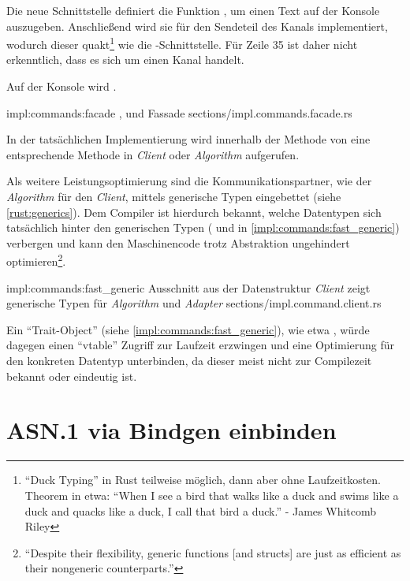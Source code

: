 Die neue Schnittstelle  definiert die Funktion , um einen Text auf der Konsole auszugeben.
Anschließend wird sie für den Sendeteil des Kanals implementiert, wodurch dieser quakt\footnote{\enquote{Duck Typing} \cite[44]{rust:orly_programming} in Rust teilweise möglich, dann aber ohne Laufzeitkosten. Theorem in etwa: \enquote{When I see a bird that walks like a duck and swims like a duck and quacks like a duck, I call that bird a duck.} - James Whitcomb Riley  } wie die -Schnittstelle.
Für Zeile 35 ist daher nicht erkenntlich, dass es sich um einen Kanal handelt.

Auf der Konsole wird  .

\rustcinclude
	{impl:commands:facade}
	{, und Fassade}
	{sections/impl.commands.facade.rs}

In der tatsächlichen Implementierung wird innerhalb der  Methode von  eine entsprechende Methode in \textit{Client} oder \textit{Algorithm} aufgerufen.

Als weitere Leistungsoptimierung sind die Kommunikationspartner, wie der \textit{Algorithm} für den \textit{Client}, mittels generische Typen eingebettet (siehe \autoref{rust:generics}).
Dem Compiler ist hierdurch bekannt, welche Datentypen sich tatsächlich hinter den generischen Typen ( und  in \autoref{impl:commands:fast_generic}) verbergen und kann den Maschinencode trotz Abstraktion ungehindert optimieren\footnote{\enquote{Despite their flexibility, generic functions [and structs] are just as efficient as their nongeneric counterparts.}\cite[45]{rust:orly_programming}}.

\rustcinclude
	{impl:commands:fast_generic}
	{Ausschnitt aus der Datenstruktur \textit{Client} zeigt generische Typen für \textit{Algorithm} und \textit{Adapter}}
	{sections/impl.command.client.rs}
	
Ein \enquote{Trait-Object} (siehe \autoref{impl:commands:fast_generic}), wie etwa , würde dagegen einen \enquote{vtable} Zugriff zur Laufzeit erzwingen und eine Optimierung für den konkreten Datentyp unterbinden, da dieser meist nicht zur Compilezeit bekannt oder eindeutig ist.

\clearpage
\section{ASN.1 via Bindgen einbinden}
\label{impl:asn1_bindings}
\label{impl:issue:ffi}


